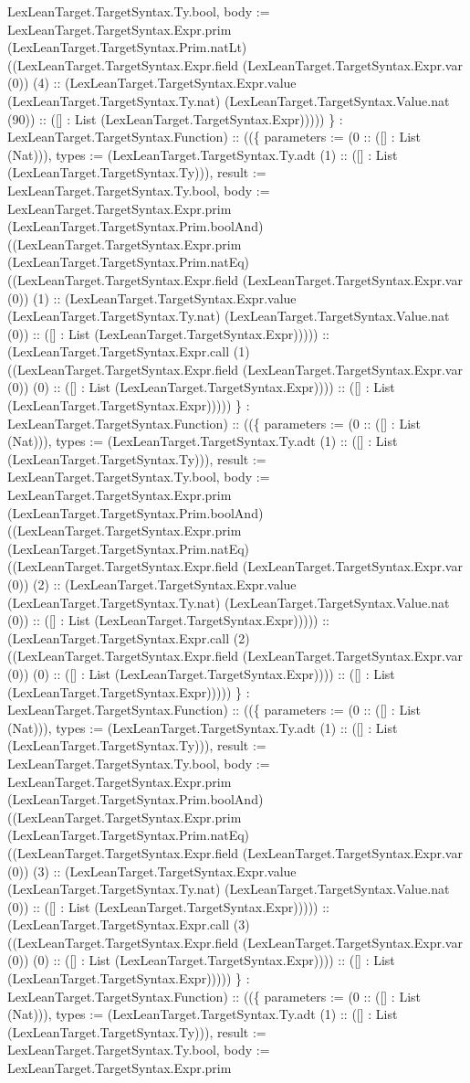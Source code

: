 \documentclass[11pt]{article}
\begin{document}
LexLeanTarget.TargetSyntax.Ty.bool, body := LexLeanTarget.TargetSyntax.Expr.prim (LexLeanTarget.TargetSyntax.Prim.natLt) ((LexLeanTarget.TargetSyntax.Expr.field (LexLeanTarget.TargetSyntax.Expr.var (0)) (4) :: (LexLeanTarget.TargetSyntax.Expr.value (LexLeanTarget.TargetSyntax.Ty.nat) (LexLeanTarget.TargetSyntax.Value.nat (90)) :: ([] : List (LexLeanTarget.TargetSyntax.Expr))))) \} : LexLeanTarget.TargetSyntax.Function) :: ((\{ parameters := (0 :: ([] : List (Nat))), types := (LexLeanTarget.TargetSyntax.Ty.adt (1) :: ([] : List (LexLeanTarget.TargetSyntax.Ty))), result := LexLeanTarget.TargetSyntax.Ty.bool, body := LexLeanTarget.TargetSyntax.Expr.prim (LexLeanTarget.TargetSyntax.Prim.boolAnd) ((LexLeanTarget.TargetSyntax.Expr.prim (LexLeanTarget.TargetSyntax.Prim.natEq) ((LexLeanTarget.TargetSyntax.Expr.field (LexLeanTarget.TargetSyntax.Expr.var (0)) (1) :: (LexLeanTarget.TargetSyntax.Expr.value (LexLeanTarget.TargetSyntax.Ty.nat) (LexLeanTarget.TargetSyntax.Value.nat (0)) :: ([] : List (LexLeanTarget.TargetSyntax.Expr))))) :: (LexLeanTarget.TargetSyntax.Expr.call (1) ((LexLeanTarget.TargetSyntax.Expr.field (LexLeanTarget.TargetSyntax.Expr.var (0)) (0) :: ([] : List (LexLeanTarget.TargetSyntax.Expr)))) :: ([] : List (LexLeanTarget.TargetSyntax.Expr))))) \} : LexLeanTarget.TargetSyntax.Function) :: ((\{ parameters := (0 :: ([] : List (Nat))), types := (LexLeanTarget.TargetSyntax.Ty.adt (1) :: ([] : List (LexLeanTarget.TargetSyntax.Ty))), result := LexLeanTarget.TargetSyntax.Ty.bool, body := LexLeanTarget.TargetSyntax.Expr.prim (LexLeanTarget.TargetSyntax.Prim.boolAnd) ((LexLeanTarget.TargetSyntax.Expr.prim (LexLeanTarget.TargetSyntax.Prim.natEq) ((LexLeanTarget.TargetSyntax.Expr.field (LexLeanTarget.TargetSyntax.Expr.var (0)) (2) :: (LexLeanTarget.TargetSyntax.Expr.value (LexLeanTarget.TargetSyntax.Ty.nat) (LexLeanTarget.TargetSyntax.Value.nat (0)) :: ([] : List (LexLeanTarget.TargetSyntax.Expr))))) :: (LexLeanTarget.TargetSyntax.Expr.call (2) ((LexLeanTarget.TargetSyntax.Expr.field (LexLeanTarget.TargetSyntax.Expr.var (0)) (0) :: ([] : List (LexLeanTarget.TargetSyntax.Expr)))) :: ([] : List (LexLeanTarget.TargetSyntax.Expr))))) \} : LexLeanTarget.TargetSyntax.Function) :: ((\{ parameters := (0 :: ([] : List (Nat))), types := (LexLeanTarget.TargetSyntax.Ty.adt (1) :: ([] : List (LexLeanTarget.TargetSyntax.Ty))), result := LexLeanTarget.TargetSyntax.Ty.bool, body := LexLeanTarget.TargetSyntax.Expr.prim (LexLeanTarget.TargetSyntax.Prim.boolAnd) ((LexLeanTarget.TargetSyntax.Expr.prim (LexLeanTarget.TargetSyntax.Prim.natEq) ((LexLeanTarget.TargetSyntax.Expr.field (LexLeanTarget.TargetSyntax.Expr.var (0)) (3) :: (LexLeanTarget.TargetSyntax.Expr.value (LexLeanTarget.TargetSyntax.Ty.nat) (LexLeanTarget.TargetSyntax.Value.nat (0)) :: ([] : List (LexLeanTarget.TargetSyntax.Expr))))) :: (LexLeanTarget.TargetSyntax.Expr.call (3) ((LexLeanTarget.TargetSyntax.Expr.field (LexLeanTarget.TargetSyntax.Expr.var (0)) (0) :: ([] : List (LexLeanTarget.TargetSyntax.Expr)))) :: ([] : List (LexLeanTarget.TargetSyntax.Expr))))) \} : LexLeanTarget.TargetSyntax.Function) :: ((\{ parameters := (0 :: ([] : List (Nat))), types := (LexLeanTarget.TargetSyntax.Ty.adt (1) :: ([] : List (LexLeanTarget.TargetSyntax.Ty))), result := LexLeanTarget.TargetSyntax.Ty.bool, body := LexLeanTarget.TargetSyntax.Expr.prim 
\end{document}
